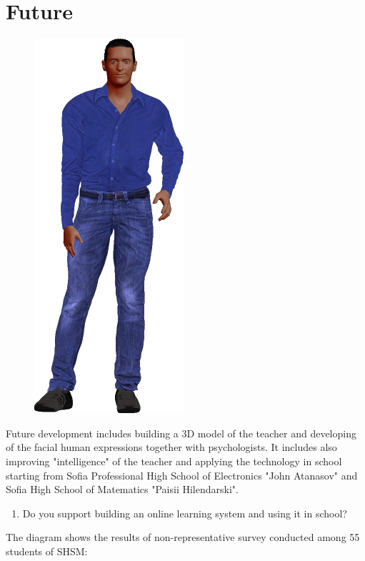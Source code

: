\documentclass[a4paper, 12pt]{article}
\newenvironment{myblocksecond}[1]{%
	\tcolorbox[beamer,%
	noparskip,breakable,
	colback=Yellow,colframe=Brown,%
	colbacklower=Brown!75!Yellow,%
	title=#1]}%
{\endtcolorbox}
\begin{document}
	\section{Future}
	\begin{figure}
		\includegraphics[scale=0.35]{bad_boy.png}
	\end{figure}
	Future development includes building a 3D model of the teacher and developing of the facial human expressions together with psychologists. 
	It includes also improving "intelligence" of the teacher and applying the technology in school starting from Sofia Professional High School of Electronics "John Atanasov" and Sofia High School of Matematics "Paisii Hilendarski". \\ \vspace{0.5cm}
	\begin{center}
		\begin{myblocksecond}{Survey questions}
			\begin{enumerate}
				\item Do you support building an online learning system and using it in school?
			\end{enumerate}
		\end{myblocksecond}
	\end{center}
	The diagram shows the results of non-representative survey conducted among 55 students of SHSM: \\
	\begin{center}
	\end{center}
\end{document}
